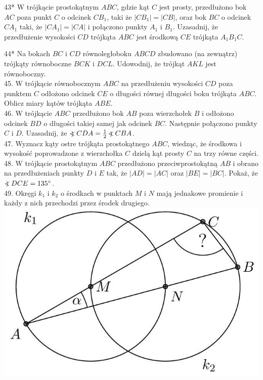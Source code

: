 \documentclass[10pt]{article}
\newcommand\Varangle{\mathop{{<\!\!\!\!\!\text{\small)}}\:}\nolimits}
\begin{document}
43* W trójkącie prostokątnym \(A B C\), gdzie kąt \(C\) jest prosty, przedłużono bok \(A C\) poza punkt \(C\) o odcinek \(C B_{1}\), taki że \(\left|C B_{1}\right|=|C B|\), oraz bok \(B C\) o odcinek \(C A_{1}\) taki, że \(\left|C A_{1}\right|=|C A|\) i połączono punkty \(A_{1}\) i \(B_{1}\). Uzasadnij, że przedłużenie wysokości \(C D\) trójkąta \(A B C\) jest środkową \(C E\) trójkąta \(A_{1} B_{1} C\).

44* Na bokach \(B C\) i \(C D\) równoległoboku \(A B C D\) zbudowano (na zewnątrz) trójkąty równoboczne \(B C K\) i \(D C L\). Udowodnij, że trójkąt \(A K L\) jest równoboczny.\\
45. W trójkącie równobocznym \(A B C\) na przedłużeniu wysokości \(C D\) poza punktem \(C\) odłożono odcinek \(C E\) o długości równej długości boku trójkąta \(A B C\). Oblicz miary kątów trójkąta \(A B E\).\\
46. W trójkącie \(A B C\) przedłużono bok \(A B\) poza wierzchołek \(B\) i odłożono odcinek \(B D\) o długości takiej samej jak odcinek \(B C\). Następnie połączono punkty \(C\) i \(D\). Uzasadnij, że \(\Varangle C D A=\frac{1}{2} \Varangle C B A\).\\
47. Wyznacz kąty ostre trójkąta prostokątnego \(A B C\), wiedząc, że środkowa i wysokość poprowadzone z wierzchołka \(C\) dzielą kąt prosty \(C\) na trzy równe części.\\
48. W trójkącie prostokątnym \(A B C\) przedłużono przeciwprostokątną \(A B\) i obrano na przedłużeniach punkty \(D\) i \(E\) tak, że \(|A D|=|A C|\) oraz \(|B E|=|B C|\). Pokaż, że \(\Varangle D C E=135^{\circ}\).\\
49. Okręgi \(k_{1}\) i \(k_{2}\) o środkach w punktach \(M\) i \(N\) mają jednakowe promienie i każdy z nich przechodzi przez środek drugiego.\\
\includegraphics[max width=\textwidth, center]{2024_11_21_71f62bd117d375398909g-177}
\end{document}
